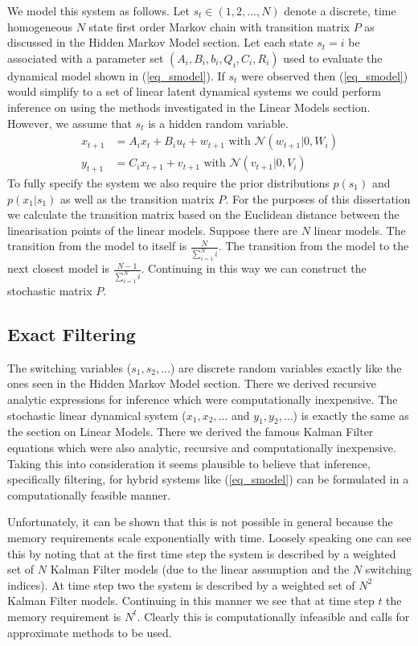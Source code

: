 We model this system as follows. Let $s_t \in (1,2,..., N)$ denote a discrete, time homogeneous $N$ state first order Markov chain with transition matrix $P$ as discussed in the Hidden Markov Model section. Let each state $s_t=i$ be associated with a parameter set $\left(A_i, B_i, b_i, Q_i, C_i, R_i \right)$ used to evaluate the dynamical model shown in (\ref{eq_smodel}). If $s_t$ were observed then (\ref{eq_smodel}) would simplify to a set of linear latent dynamical systems we could perform inference on using the methods investigated in the Linear Models section. However, we assume that $s_t$ is a hidden random variable.
\begin{equation}
\begin{aligned}
x_{t+1} &= A_ix_t + B_iu_t + w_{t+1} \text{ with } \mathcal{N}(w_{t+1}|0,W_i) \\
y_{t+1} &= C_ix_{t+1} + v_{t+1}  \text{ with } \mathcal{N}(v_{t+1}|0,V_i)
\end{aligned}
\label{eq_smodel}
\end{equation}
To fully specify the system we also require the prior distributions $p(s_1)$ and $p(x_1|s_1)$ as well as the transition matrix $P$. For the purposes of this dissertation we calculate the transition matrix based on the Euclidean distance between the linearisation points of the linear models. Suppose there are $N$ linear models. The transition from the model to itself is $\frac{N}{\sum_{i=1}^N i}$. The transition from the model to the next closest model is $\frac{N-1}{\sum_{i=1}^N i}$. Continuing in this way we can construct the stochastic matrix $P$.

\subsection{Exact Filtering}
The switching variables ($s_1, s_2,...$) are discrete random variables exactly like the ones seen in the Hidden Markov Model section. There we derived recursive analytic expressions for inference which were computationally inexpensive. The stochastic linear dynamical system ($x_1,x_2,...$ and $y_1, y_2,...$) is exactly the same as the section on Linear Models. There we derived the famous Kalman Filter equations which were also analytic, recursive and computationally inexpensive. Taking this into consideration it seems plausible to believe that inference, specifically filtering, for hybrid systems like (\ref{eq_smodel}) can be formulated in a computationally feasible manner. 

Unfortunately, it can be shown that this is not possible in general \cite{lerner}\cite{murphy3} because the memory requirements scale exponentially with time. Loosely speaking one can see this by noting that at the first time step the system is described by a weighted set of $N$ Kalman Filter models (due to the linear assumption and the $N$ switching indices). At time step two the system is described by a weighted set of $N^2$ Kalman Filter models. Continuing in this manner we see that at time step $t$ the memory requirement is $N^t$. Clearly this is computationally infeasible and calls for approximate methods to be used. 

